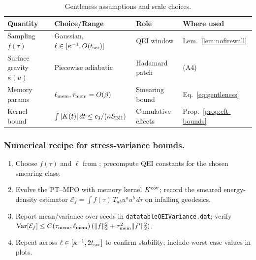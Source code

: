 \documentclass[11pt,a4paper]{article}
\theoremstyle{plain}
\theoremstyle{definition}
\theoremstyle{remark}
\begin{document}
\begin{table}[t]
\centering
\caption{Gentleness assumptions and scale choices.}
\label{tab:gentleness-assumptions}
\footnotesize
\begin{tabular*}{\textwidth}{@{\extracolsep{\fill}}llll@{}}
\toprule
Quantity & Choice/Range & Role & Where used \\\midrule
Sampling $f(\tau)$ & Gaussian, $\ell\in[\kappa^{-1},O(t_{\rm scr})]$ & QEI window & Lem.~\ref{lem:nofirewall} \\
Surface gravity $\kappa(u)$ & Piecewise adiabatic & Hadamard patch & (A4) \\
Memory params & $\ell_{\rm mem},\tau_{\rm mem}=O(\beta)$ & Smearing bound & Eq.~\eqref{eq:gentleness} \\
Kernel bound & $\int |K(t)|\,dt \le c_3/(\kappa S_{\rm BH})$ & Cumulative effects & Prop.~\ref{prop:eft-bounds} \\\bottomrule
\end{tabular*}
\end{table}

\subsubsection{Numerical recipe for stress-variance bounds.}
\begin{enumerate}[leftmargin=*]
\item Choose $f(\tau)$ and $\ell$ from ; precompute QEI constants for the chosen smearing class.
\item Evolve the PT--MPO with memory kernel $K^{\rm cov}$; record the smeared energy-density estimator
$\mathcal{E}_f=\int f(\tau)\,T_{ab}u^au^b\,d\tau$ on infalling geodesics.
\item Report mean/variance over seeds in \texttt{datatableQEIVariance.dat}; verify $\mathrm{Var}[\mathcal{E}_f]\le C(\tau_{\rm mem},\ell_{\rm mem})\,(\|f\|_2^2+\tau_{\rm mem}^2\|f'\|_2^2)$.
\item Repeat across $\ell\in[\kappa^{-1},2t_{\rm scr}]$ to confirm stability; include worst-case values in plots.
\end{enumerate}
\end{document}
